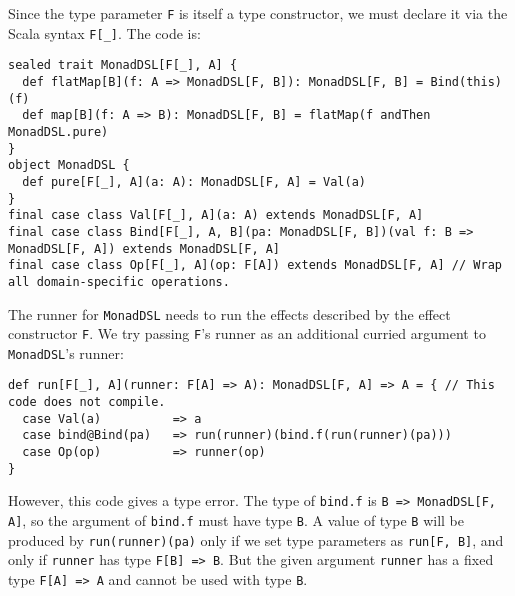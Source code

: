 Since the type parameter \lstinline!F!
is itself a type constructor, we must declare it via the Scala syntax
\lstinline!F[_]!. The code
is:
\begin{lstlisting}
sealed trait MonadDSL[F[_], A] {
  def flatMap[B](f: A => MonadDSL[F, B]): MonadDSL[F, B] = Bind(this)(f)
  def map[B](f: A => B): MonadDSL[F, B] = flatMap(f andThen MonadDSL.pure)
}
object MonadDSL {
  def pure[F[_], A](a: A): MonadDSL[F, A] = Val(a)
}
final case class Val[F[_], A](a: A) extends MonadDSL[F, A]
final case class Bind[F[_], A, B](pa: MonadDSL[F, B])(val f: B => MonadDSL[F, A]) extends MonadDSL[F, A]
final case class Op[F[_], A](op: F[A]) extends MonadDSL[F, A] // Wrap all domain-specific operations.
\end{lstlisting}
The runner for \lstinline!MonadDSL!
needs to run the effects described by the effect constructor \lstinline!F!.
We try passing \lstinline!F!\textsf{'}s
runner as an additional curried argument to \lstinline!MonadDSL!\textsf{'}s
runner:
\begin{lstlisting}
def run[F[_], A](runner: F[A] => A): MonadDSL[F, A] => A = { // This code does not compile.
  case Val(a)          => a
  case bind@Bind(pa)   => run(runner)(bind.f(run(runner)(pa)))
  case Op(op)          => runner(op)
}
\end{lstlisting}
However, this code gives a type error. The type of \lstinline!bind.f!
is \lstinline!B => MonadDSL[F, A]!,
so the argument of \lstinline!bind.f!
must have type \lstinline!B!.
A value of type \lstinline!B!
will be produced by \lstinline!run(runner)(pa)!
only if we set type parameters as \lstinline!run[F, B]!,
and only if \lstinline!runner!
has type \lstinline!F[B] => B!.
But the given argument \lstinline!runner!
has a fixed type \lstinline!F[A] => A!
and cannot be used with type \lstinline!B!.

